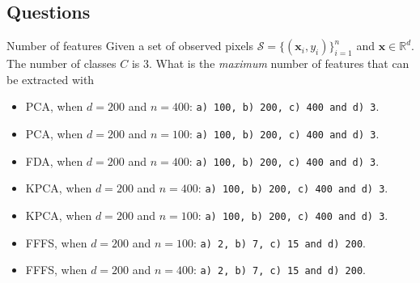 \documentclass[10pt,aspectratio=1610]{beamer}
\begin{document}
\subsection{Questions}
\label{sec:org17726ba}
\begin{frame}[fragile,label={sec:org32713ba}]{Number of features}
 Given         a         set         of         observed         pixels
\(\mathcal{S}=\{(\mathbf{x}_i,y_i)\}_{i=1}^n\)                       and
\(\mathbf{x}\in\mathbb{R}^{d}\). The number of classes \(C\) is \(3\).  What
is the \emph{maximum} number of features that can be extracted with

\begin{itemize}
\item <1> PCA, when \(d=200\) and \(n=400\): \texttt{a) 100, b) 200, c) 400 and d) 3}.
\item <2> PCA, when \(d=200\) and \(n=100\):  \texttt{a) 100, b) 200, c) 400 and d) 3}.
\item <3> FDA, when \(d=200\) and \(n=400\):  \texttt{a) 100, b) 200, c) 400 and d) 3}.
\item <4> KPCA, when \(d=200\) and \(n=400\):  \texttt{a) 100, b) 200, c) 400 and d) 3}.
\item <5> KPCA, when \(d=200\) and \(n=100\):  \texttt{a) 100, b) 200, c) 400 and d) 3}.
\item <6> FFFS, when \(d=200\) and \(n=100\):  \texttt{a) 2, b) 7, c) 15 and d) 200}.
\item <7> FFFS, when \(d=200\) and \(n=400\):  \texttt{a) 2, b) 7, c) 15 and d) 200}.
\end{itemize}
\end{frame}
\end{document}
